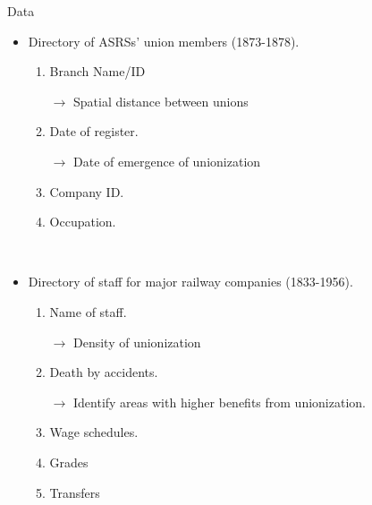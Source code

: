 \begin{frame}{Data}
\begin{itemize}
    \item Directory of ASRSs' union members (1873-1878).
    \begin{enumerate}
        \item Branch Name/ID
        
        $\rightarrow$\color{red} Spatial distance between unions \color{black}        
        
        \item Date of register.
        
        $\rightarrow$\color{red} Date of emergence of unionization \color{black}
        \item Company ID.
        \item Occupation.
    \end{enumerate}

    \

    \item Directory of staff for major railway companies (1833-1956).
    \begin{enumerate}
        \item Name of staff.
        
        $\rightarrow$\color{red} Density of unionization \color{black}
        \item Death by accidents.
        
        $\rightarrow$\color{red} Identify areas with higher benefits from unionization. \color{black}

        \item Wage schedules.

        \item Grades

        \item Transfers
    \end{enumerate}
\end{itemize}
\end{frame}

